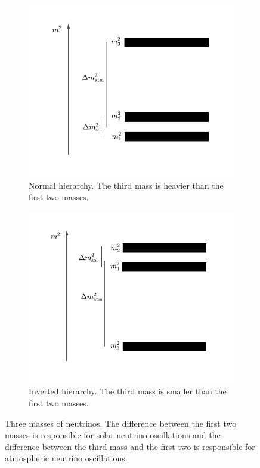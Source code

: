 \begin{figure}
	\centering
	\begin{subfigure}[t]{0.48\textwidth}
		\centering
		\includegraphics[width=\textwidth]{chapters/assets/basics/masses-nh}
		\caption{Normal hierarchy. The third mass is heavier than the first two masses.}
    \label{chap:basics-sec:flavor-isospin-pic-fig:masses-nh}
	\end{subfigure}
	\quad
	\begin{subfigure}[t]{0.48\textwidth}
		\centering
		\includegraphics[width=\textwidth]{chapters/assets/basics/masses-ih}
		\caption{Inverted hierarchy. The third mass is smaller than the first two masses.}
    \label{chap:basics-sec:flavor-isospin-pic-fig:masses-ih}
	\end{subfigure}
	\caption{Three masses of neutrinos. The difference between the first two masses is responsible for solar neutrino oscillations and the difference between the third mass and the first two is responsible for atmospheric neutrino oscillations.}
    \label{chap:basics-sec:flavor-isospin-pic-fig:masses}
\end{figure}

